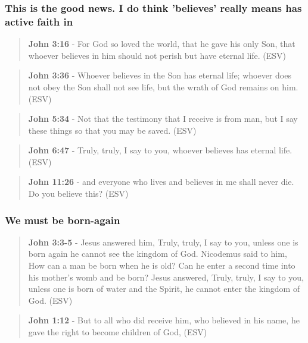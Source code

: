 \documentclass[11pt]{article}
\begin{document}
\subsubsection{This is the good news. I do think 'believes' really means has active faith in}
\label{sec:orgbf4834f}
\begin{quote}
\textbf{John 3:16} - For God so loved the world, that he gave his only Son, that whoever believes in him should not perish but have eternal life. (ESV)
\end{quote}

\begin{quote}
\textbf{John 3:36} - Whoever believes in the Son has eternal life; whoever does not obey the Son shall not see life, but the wrath of God remains on him. (ESV)
\end{quote}

\begin{quote}
\textbf{John 5:34} - Not that the testimony that I receive is from man, but I say these things so that you may be saved. (ESV)
\end{quote}

\begin{quote}
\textbf{John 6:47} - Truly, truly, I say to you, whoever believes has eternal life. (ESV)
\end{quote}

\begin{quote}
\textbf{John 11:26} - and everyone who lives and believes in me shall never die. Do you believe this? (ESV)
\end{quote}

\subsubsection{We must be born-again}
\label{sec:orgea16a89}
\begin{quote}
\textbf{John 3:3-5} - Jesus answered him, Truly, truly, I say to you, unless one is born again he cannot see the kingdom of God.  Nicodemus said to him, How can a man be born when he is old?  Can he enter a second time into his mother's womb and be born?  Jesus answered, Truly, truly, I say to you, unless one is born of water and the Spirit, he cannot enter the kingdom of God. (ESV)
\end{quote}

\begin{quote}
\textbf{John 1:12} - But to all who did receive him, who believed in his name, he gave the right to become children of God, (ESV)
\end{quote}
\end{document}
